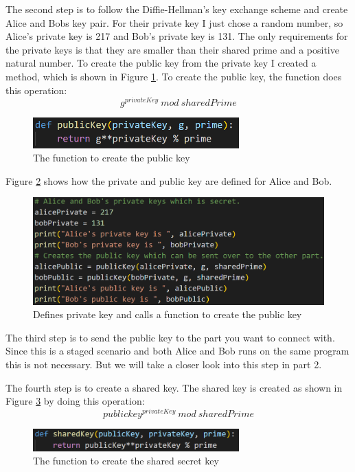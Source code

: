 \documentclass[12pt, letterpaper]{article}
\begin{document}
The second step is to follow the Diffie-Hellman's key exchange scheme and create Alice and Bobs key pair. For their private key I just chose a random number, so Alice's private key is 217 and Bob's private key is 131. The only requirements for the private keys is that they are smaller than their shared prime and a positive natural number. To create the public key from the private key I created a method, which is shown in Figure \ref{fig:step2_func}. To create the public key, the function does this operation: $$g^{privateKey}\ mod\ sharedPrime$$

\begin{figure}[H]
  \includegraphics[width=300px]{code_snippets/step2_func.PNG}\centering
  \caption{The function to create the public key}
  \label{fig:step2_func}
\end{figure}

Figure \ref{fig:step2} shows how the private and public key are defined for Alice and Bob.

\begin{figure}[H]
  \includegraphics[width=\linewidth]{code_snippets/step2.PNG}
  \caption{Defines private key and calls a function to create the public key}
  \label{fig:step2}
\end{figure}

The third step is to send the public key to the part you want to connect with. Since this is a staged scenario and both Alice and Bob runs on the same program this is not necessary. But we will take a closer look into this step in part 2. 

The fourth step is to create a shared key. The shared key is created as shown in Figure \ref{fig:step4_func} by doing this operation: $$publickey^{privateKey} \ mod \ sharedPrime$$

\begin{figure}[H]
  \includegraphics[width=300px]{code_snippets/step4_func.PNG}\centering
  \caption{The function to create the shared secret key}
  \label{fig:step4_func}
\end{figure}
\end{document}
